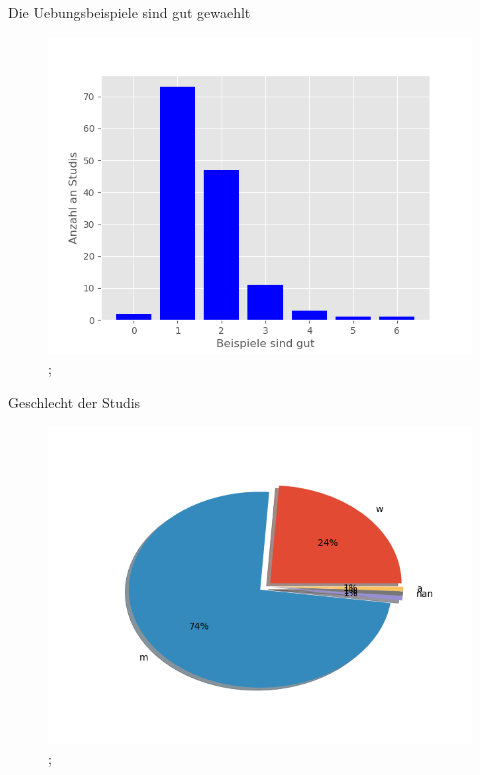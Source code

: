 \documentclass[10pt]{beamer}
\begin{document}
\begin{frame}[fragile]{Die Uebungsbeispiele sind gut gewaehlt} 
 \begin{figure}
 \includegraphics[width= 0.9\linewidth]{./PDFcreater/Plots/Die+Uebungsbeispiele+sind+gut+gewaehlt.png};
 \end{figure}
 \end{frame}
\begin{frame}[fragile]{Geschlecht der Studis} 
 \begin{figure}
 \includegraphics[width= 0.9\linewidth]{./PDFcreater/Plots/Geschlecht+der+Studis.png};
 \end{figure}
 \end{frame}
\end{document}
